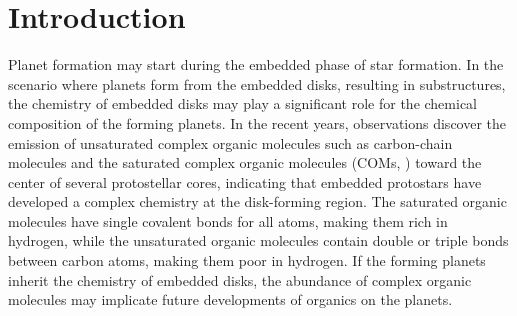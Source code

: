 \documentclass[twocolumn]{aastex62}
\newcommand{\methylformate}{\mbox{HCOOCH$_{3}$}}
\newcommand{\methanol}{\mbox{CH$_{3}$OH}}
\newcommand{\dimethylether}{\mbox{CH$_{3}$OCH$_{3}$}}
\newcommand{\methylcyanide}{\mbox{CH$_{3}$CN}}
\begin{document}
\begin{abstract}
  Complex organic molecules at the protostellar phase constrain the chemistry at the warm inner envelope as well as the disk-forming region, which may affect the chemical composition of disks and the planet formation therein.  This study introduces an unbiased ALMA chemistry survey toward the Class 0/I protostars in the Perseus molecule cloud (PEACHES) and characterize the statistics of the abundance complex organic molecules.  Among the 50 embedded protostars surveyed, 58\%\ have emission of COMs with 56\%\ have \methanol, 32\%\ have \methylformate, and 40\% have N-bearing COMs.  The column densities of COMs modeled with LTE radiative transfer correlate with each other and remain correlated with the normalizations of the bolometric luminosities, the bolometric temperature, and the average continuum brightness temperature.  The similar chemistry of COMs among a diverse sample hints a universal chemistry of COMs at the embedded phase of star formation.  At the same time, the abundance of more complex species, such as \methylformate\ and \dimethylether, relative to that of less complex species, such as \methanol\ and \methylcyanide, increases as the inferred gas column density, suggesting a possible enhanced production of more complex species at more embedded sources. 
\end{abstract}
\keywords{}

\section{Introduction}


Planet formation may start during the embedded phase of star formation.  In the scenario where planets form from the embedded disks, resulting in substructures, the chemistry of embedded disks may play a significant role for the chemical composition of the forming planets.  In the recent years, observations discover the emission of unsaturated complex organic molecules such as carbon-chain molecules \citep[e.g., ][]{2013ChRv..113.8981S,2014Natur.507...78S,2018ApJ...863...88L} and the saturated complex organic molecules (COMs, \citealt[e.g., ][]{2003ApJ...593L..51C,2007A&A...463..601B,2020arXiv200607071J}) toward the center of several protostellar cores, indicating that embedded protostars have developed a complex chemistry at the disk-forming region.  The saturated organic molecules have single covalent bonds for all atoms, making them rich in hydrogen, while the unsaturated organic molecules contain double or triple bonds between carbon atoms, making them poor in hydrogen.  If the forming planets inherit the chemistry of embedded disks, the abundance of complex organic molecules may implicate future developments of organics on the planets. 
\end{document}

